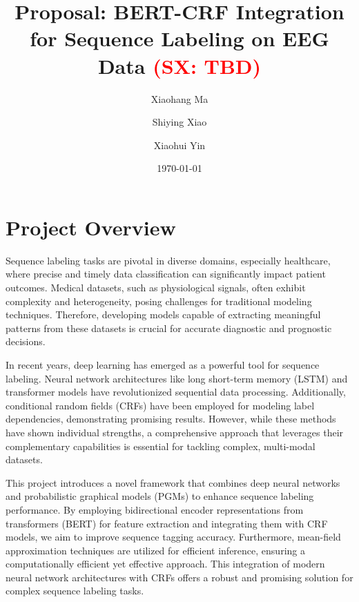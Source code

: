 \documentclass[12pt]{article}
\newcommand{\sx}[1]{\textcolor{red}{(SX: #1)}}
\begin{document}
\title{Proposal:
BERT-CRF Integration for Sequence Labeling on EEG Data \sx{TBD}}

\author[1]{Xiaohang Ma}
\author[2]{Shiying Xiao}
\author[2]{Xiaohui Yin}


\date{\today}

\maketitle


\section{Project Overview}


Sequence labeling tasks are pivotal in diverse domains, especially healthcare,
where precise and timely data classification can significantly impact patient
outcomes. Medical datasets, such as physiological signals, often exhibit
complexity and heterogeneity, posing challenges for traditional modeling
techniques. Therefore, developing models capable of extracting meaningful
patterns from these datasets is crucial for accurate diagnostic and prognostic
decisions.


In recent years, deep learning has emerged as a powerful tool for sequence
labeling. Neural network architectures like long short-term memory (LSTM) and
transformer models have revolutionized sequential data processing.
Additionally, conditional random fields (CRFs) have been employed for modeling
label dependencies, demonstrating promising results.
However, while these methods have shown individual strengths, a comprehensive
approach that leverages their complementary capabilities is essential for
tackling complex, multi-modal datasets.


This project introduces a novel framework that combines deep neural networks
and probabilistic graphical models (PGMs) to enhance sequence labeling
performance. By employing bidirectional encoder representations from
transformers (BERT) for feature extraction and integrating them with CRF models,
we aim to improve sequence tagging accuracy. Furthermore, mean-field
approximation techniques are utilized for efficient inference, ensuring a
computationally efficient yet effective approach.
This integration of modern neural network architectures with CRFs offers
a robust and promising solution for complex sequence labeling tasks.





\end{document}
